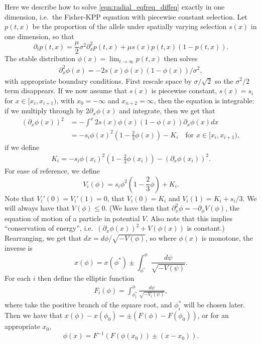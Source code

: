 \documentclass{article}
\begin{document}
Here we describe how to solve \eqref{eqn:radial_eqfreq_diffeq} exactly in one dimension,
i.e.\ the Fisher-KPP equation with piecewise constant selection.
Let $p(t,x)$ be the proportion of the allele under spatially varying selection $s(x)$ in one dimension,
so that 
\[
\partial_t p(t,x) = \frac{\mu}{2} \sigma^2 \partial_x^2 p(t,x) + \mu s(x) p(t,x) (1-p(t,x)) .
\]
The stable distribution $\phi(x) = \lim_{t\to\infty} p(t,x)$ then solves
\begin{align} \label{eqn:definingphi}
    \partial_x^2 \phi(x) = - 2 s(x) \phi(x) (1-\phi(x)) /\sigma^2,
\end{align}
with appropriate boundary conditions.
First rescale space by $\sigma/\sqrt{2}$ so the $\sigma^2/2$ term disappears.
If we now assume that $s(x)$ is piecewise constant,
$s(x) = s_i$ for $x \in [x_i,x_{i+1})$, with $x_0=-\infty$ and $x_{n+2}=\infty$,
then the equation is integrable: if we multiply through by $2\partial_x \phi(x)$ and integrate, then we get that
\begin{align} \label{eqn:conservation}
    ( \partial_x \phi(x) )^2  &= - \int^{x} 2 s(x) \phi(x) (1-\phi(x)) \partial_x \phi(x) dx \\
        &= - s_i \phi(x)^2 \left( 1 - \frac{2}{3} \phi(x) \right) - K_i \quad \mbox{for } x \in [x_i,x_{i+1}) ,
\end{align}
if we define
\begin{align} 
  K_i = - s_i \phi(x_i)^2 \left( 1 - \frac{2}{3} \phi(x_i) \right) - ( \partial_x \phi(x_i) )^2  .
\end{align}
For ease of reference, we define
\[
        V_i(\phi) = s_i \phi^2 \left( 1 - \frac{2}{3} \phi \right) + K_i .
\]
Note that $V_i'(0)=V_i'(1)=0$, that $V_i(0)=K_i$ and $V_i(1) = K_i+s_i/3$.  
We will always have that $V(\phi) \le 0$.
(We have then that $\partial_x^2 \phi = - \partial_\phi V(\phi)$, the equation of motion of a particle in potential $V$.
Also note that this implies ``conservation of energy'', i.e.\ $( \partial_x \phi(x) )^2 + V(\phi(x))$ is constant.)
Rearranging, we get that $dx = d\phi / \sqrt{-V(\phi)}$, so where $\phi(x)$ is monotone, the inverse is
\[
    x(\phi) = x(\phi^*) \pm \int_{\phi^*}^\phi \frac{ d\psi }{ \sqrt{ -V(\psi) } } .
\]
For each $i$ then define the elliptic function
\begin{align}  \label{eqn:elliptic_function}
    F_i(\phi) = \int_{\phi_i^*}^\phi \frac{ d\psi }{ \sqrt{ -V_i(\psi) } } ,
\end{align}
where take the positive branch of the square root, and $\phi_i^*$ will be chosen later.
Then we have that
$x(\phi) - x(\phi_0) = \pm( F(\phi) - F(\phi_0))$,
or for an appropriate $x_0$,
\[
    \phi(x) = F^{-1}\left( F(\phi(x_0)) \pm (x - x_0) \right).
\]
\end{document}

